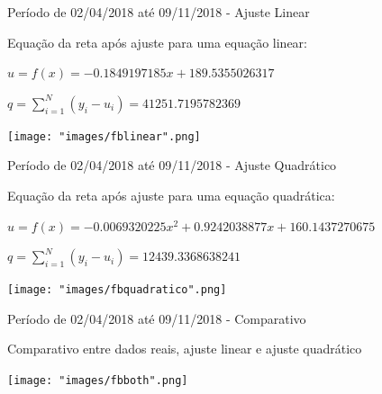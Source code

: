 \documentclass[10pt]{beamer}
\begin{document}
\begin{frame}{Período de 02/04/2018 até 09/11/2018 - Ajuste Linear}

  Equação da reta após ajuste para uma equação linear:
  \begin{center}
  $u = f(x) = -0.1849197185x + 189.5355026317$
  
  $q = \sum_{i=1}^{N} (y_{i}-u_{i}) = 41251.7195782369$
  \end{center}
  
  \begin{center}
    \texttt{[image: "images/fblinear".png]}
  \end{center}
\end{frame}

\begin{frame}{Período de 02/04/2018 até 09/11/2018 - Ajuste Quadrático}

  Equação da reta após ajuste para uma equação quadrática:
  \begin{center}
  $u = f(x) = -0.0069320225x^2 + 0.9242038877x + 160.1437270675$
  
  $q = \sum_{i=1}^{N} (y_{i}-u_{i}) = 12439.3368638241$
  \end{center}
  
  \begin{center}
    \texttt{[image: "images/fbquadratico".png]}
  \end{center}
\end{frame}


\begin{frame}{Período de 02/04/2018 até 09/11/2018 - Comparativo}

  Comparativo entre dados reais, ajuste linear e ajuste quadrático
  
  \begin{center}
    \texttt{[image: "images/fbboth".png]}
  \end{center}
\end{frame}
\end{document}
